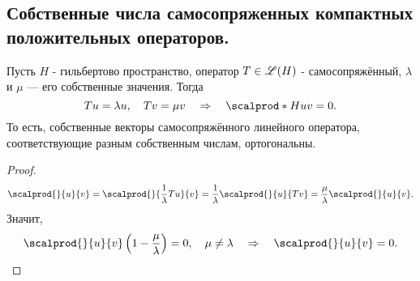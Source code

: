 
\subsection{Собственные числа самосопряженных компактных положительных операторов.}
\begin{prop} Пусть $H$ - гильбертово пространство, оператор $T \in \mathscr{L}(H)$ - самосопряжённый, $\lambda$ и $\mu$ --- его собственные значения. Тогда
$$ Tu = \lambda u, \quad Tv = \mu v \quad \Rightarrow \quad \scalprod*{H}{u}{v} = 0.$$
То есть, собственные векторы самосопряжённого линейного оператора, соответствующие разным собственным числам, ортогональны.
\end{prop}
\begin{proof}

$$\scalprod{}{u}{v} = \scalprod{}{\frac{1}{\lambda} T u}{v} = \frac{1}{\lambda} \scalprod{}{u}{Tv} = \frac {\mu}{\lambda} \scalprod{}{u}{v}.$$
Значит,
$$ \scalprod{}{u}{v} \left( 1 - \frac{\mu}{\lambda} \right) = 0, \quad \mu \neq \lambda \quad \Rightarrow \quad \scalprod{}{u}{v} = 0.$$

\end{proof}

